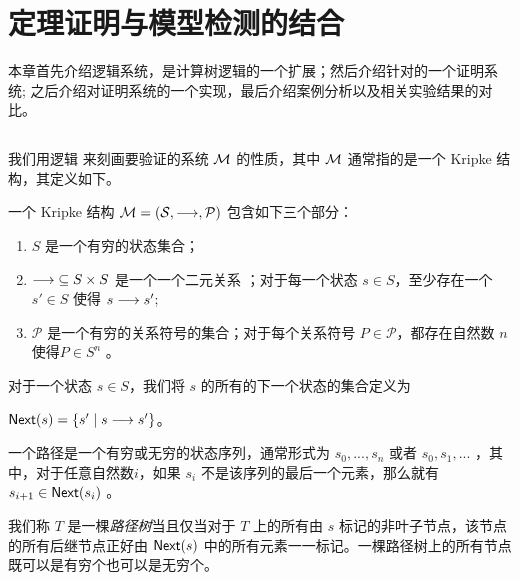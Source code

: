 \chapter{定理证明与模型检测的结合}\label{chapt:sctl}
本章首先介绍逻辑系统\CTLP{}，\CTLP{}是计算树逻辑\CTL{}的一个扩展；然后介绍针对\CTLP{}的一个证明系统\SCTL{}; 之后介绍对证明系统\SCTL{}的一个实现\sctlprov，最后介绍案例分析以及相关实验结果的对比。

\section{\CTLP{}}\label{sec:ctlp}
我们用逻辑  来刻画要验证的系统 $\cal M$ 的性质，其中 $\cal M$ 通常指的是一个 Kripke 结构，其定义如下。
\begin{definition}[Kripke 结构]
	一个 Kripke 结构 $\cal M = (S, \longrightarrow, \mathcal{P})$ 包含如下三个部分：
	\begin{enumerate}
		\item $S$ 是一个有穷的状态集合；
		\item $\longrightarrow\;\subseteq S \times S$ 是一个一个二元关系 ；对于每一个状态 $s\in S$，至少存在一个 $s'\in S$ 使得 $s\longrightarrow s'$;
		\item $\mathcal{P}$ 是一个有穷的关系符号的集合；对于每个关系符号 $P\in \mathcal{P}$，都存在自然数 $n$ 使得$P\in S^n$ 。
	\end{enumerate}
\end{definition}
对于一个状态 $s\in S$，我们将 $s$ 的所有的下一个状态的集合定义为
\begin{center}
	$\textsf{Next}({s}) = \{s'\mid s\longrightarrow s'\}$。 
\end{center} 
一个路径是一个有穷或无穷的状态序列，通常形式为 $s_0,...,s_n$ 或者 $s_0,s_1,...$ ，其中，对于任意自然数$i$，如果 $s_i$ 不是该序列的最后一个元素，那么就有 $s_{i+1}\in \textsf{Next}({s_i})$ 。

我们称 $T$ 是一棵\textit{路径树}当且仅当对于 $T$ 上的所有由 $s$ 标记的非叶子节点，该节点的所有后继节点正好由 $\textsf{Next}({s})$ 中的所有元素一一标记。一棵路径树上的所有节点既可以是有穷个也可以是无穷个。


